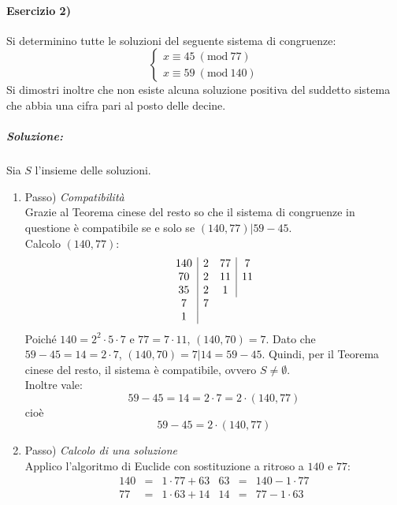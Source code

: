\documentclass[12pt, a4paper]{report}
\theoremstyle{definition}
\newcommand{\Mod}[1]{\ (\mathrm{mod}\ #1)}
\begin{document}
\paragraph{Esercizio 2)}
Si determinino tutte le soluzioni del seguente sistema di congruenze:
\[\begin{cases}
    x\equiv45\Mod{77}\\
    x\equiv59\Mod{140}
\end{cases}\]
Si dimostri inoltre che non esiste alcuna soluzione positiva del suddetto sistema
che abbia una cifra pari al posto delle decine.
\subparagraph{Soluzione:}
Sia $S$ l'insieme delle soluzioni.
\begin{enumerate}[label={\arabic*$^o$}]
    \item Passo) \emph{Compatibilità}\\
    Grazie al Teorema cinese del resto so che il sistema di congruenze in questione
    è compatibile se e solo se $(140,77)|59-45$.\\
    Calcolo $(140,77)$:
    \[\begin{array}[t]{c|c}
        140 & 2\\
        70 & 2\\
        35 & 2\\
        7 & 7\\
        1
    \end{array}
    \begin{array}[t]{c|c}
        77 & 7\\
        11 & 11\\
        1
    \end{array}\]
    Poiché $140=2^2\cdot5\cdot7$ e $77=7\cdot11$, $(140,70)=7$. Dato che $59-45=
    14=2\cdot7$, $(140,70)=7|14=59-45$. Quindi, per il Teorema cinese del resto,
    il sistema è compatibile, ovvero $S\neq\emptyset$.\\
    Inoltre vale:
    \[59-45=14=2\cdot7=2\cdot(140,77)\]
    cioè
    \begin{equation}\label{eq:1}
        59-45=2\cdot(140,77)
    \end{equation}
    \item Passo) \emph{Calcolo di una soluzione}\\
    Applico l'algoritmo di Euclide con sostituzione a ritroso a $140$ e $77$:
    \[\begin{array}{rcl|rcl}
        140 &= &1\cdot77+63 & 63 &= &140-1\cdot77\\
        77 &= &1\cdot63+14 & 14 &= &77-1\cdot63\\

\end{array}\]
\end{enumerate}
\end{document}
